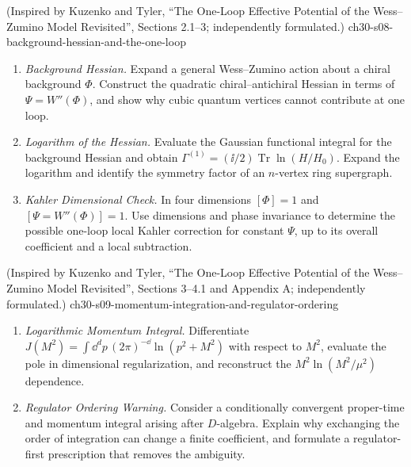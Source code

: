 \begin{enumerate}
    {(Inspired by Kuzenko and Tyler, ``The One-Loop Effective Potential of the Wess--Zumino Model Revisited'', Sections 2.1--3; independently formulated.)}
    {ch30-s08-background-hessian-and-the-one-loop}
  \begin{enumerate}
    \item \emph{Background Hessian.}
    Expand a general Wess--Zumino action about a chiral background
      \(\Phi\).  Construct the quadratic chiral--antichiral Hessian in
      terms of \(\Psi=W''(\Phi)\), and show why cubic quantum vertices
      cannot contribute at one loop.
    \item \emph{Logarithm of the Hessian.}
    Evaluate the Gaussian functional integral for the background
      Hessian and obtain
      \(\Gamma^{(1)}=(\ii/2)\operatorname{Tr}\ln(H/H_0)\).
      Expand the logarithm and identify the symmetry factor of an
      \(n\)-vertex ring supergraph.
    \item \emph{Kahler Dimensional Check.}
    In four dimensions \([\Phi]=1\) and \([\Psi=W''(\Phi)]=1\).
      Use dimensions and phase invariance to determine the possible
      one-loop local Kahler correction for constant \(\Psi\), up to its
      overall coefficient and a local subtraction.
  \end{enumerate}

    {(Inspired by Kuzenko and Tyler, ``The One-Loop Effective Potential of the Wess--Zumino Model Revisited'', Sections 3--4.1 and Appendix A; independently formulated.)}
    {ch30-s09-momentum-integration-and-regulator-ordering}
  \begin{enumerate}
    \item \emph{Logarithmic Momentum Integral.}
    Differentiate
      \(J(M^2)=\int \dd^dp\,(2\pi)^{-\dd}\ln(p^2+M^2)\) with respect to
      \(M^2\), evaluate the pole in dimensional regularization, and
      reconstruct the \(M^2\ln(M^2/\mu^2)\) dependence.
    \item \emph{Regulator Ordering Warning.}
    Consider a conditionally convergent proper-time and momentum
      integral arising after \(D\)-algebra.  Explain why exchanging the
      order of integration can change a finite coefficient, and formulate
      a regulator-first prescription that removes the ambiguity.
  \end{enumerate}


\end{enumerate}
